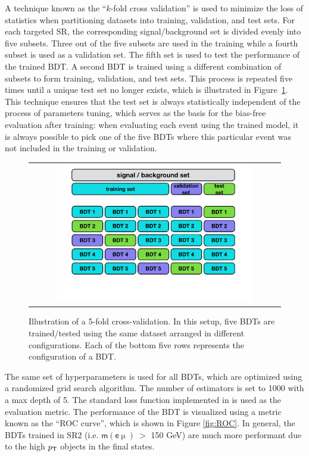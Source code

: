 A technique known as the ``$k$-fold cross validation'' is used to minimize the loss of statistics when partitioning datasets into training, validation, and test sets. For each targeted \ac{SR}, the corresponding signal/background set is divided evenly into five subsets. Three out of the five subsets are used in the training while a fourth subset is used as a validation set. The fifth set is used to test the performance of the trained \ac{BDT}. A second \ac{BDT} is trained using a different combination of subsets to form training, validation, and test sets. This process is repeated five times until a unique test set no longer exists, which is illustrated in Figure~\ref{fig:5fold}. This technique ensures that the test set is always statistically independent of the process of parameters tuning, which serves as the basis for the bias-free evaluation after training: when evaluating each event using the trained model, it is always possible to pick one of the five \acp{BDT} where this particular event was not included in the training or validation.

\begin{figure}[tbh!]
 \begin{center}
 \begin{tabular}{c}
 \includegraphics[width=0.8\textwidth]{figures/Part3/BDT/kfold}
 \end{tabular}
  \caption{Illustration of a 5-fold cross-validation. In this setup, five \acp{BDT} are trained/tested using the same dataset arranged in different configurations. Each of the bottom five rows represents the configuration of a \ac{BDT}.}
 \label{fig:5fold}
 \end{center}
\end{figure}

The same set of hyperparameters is used for all \acp{BDT}, which are optimized using a randomized grid search algorithm. The number of estimators is set to 1000 with a max depth of 5. The standard loss function implemented in \cite{Chen:2016:XST:2939672.2939785} is used as the evaluation metric. The performance of the \ac{BDT} is visualized using a metric known as the ``\ac{ROC} curve'', which is shown in Figure \ref{fig:ROC}. In general, the \acp{BDT} trained in \ac{SR}2 (i.e. $\textsf{m}(\textsf{e}\upmu)~>$ 150 GeV) are much more performant due to the high $p_{\textsf{T}}$ objects in the final states.

